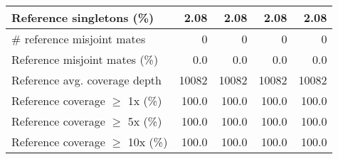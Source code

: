 \documentclass[12pt,a4paper]{article}
\begin{document}
\begin{table}[ht]
\begin{center}
\begin{tabular}{|l*{4}{|r}|}
Reference singletons (\%) & 2.08 & 2.08 & 2.08 & 2.08 \\ \hline
\# reference misjoint mates & 0 & 0 & 0 & 0 \\ \hline
Reference misjoint mates (\%) & 0.0 & 0.0 & 0.0 & 0.0 \\ \hline
Reference avg. coverage depth & 10082 & 10082 & 10082 & 10082 \\ \hline
Reference coverage $\geq$ 1x (\%) & 100.0 & 100.0 & 100.0 & 100.0 \\ \hline
Reference coverage $\geq$ 5x (\%) & 100.0 & 100.0 & 100.0 & 100.0 \\ \hline
Reference coverage $\geq$ 10x (\%) & 100.0 & 100.0 & 100.0 & 100.0 \\ \hline
\end{tabular}
\end{center}
\end{table}
\end{document}
